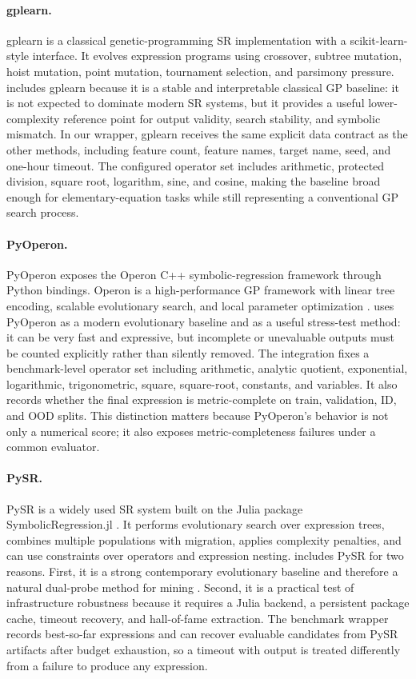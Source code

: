 \paragraph{gplearn.}
gplearn is a classical genetic-programming SR implementation with a scikit-learn-style interface. It evolves expression programs using crossover, subtree mutation, hoist mutation, point mutation, tournament selection, and parsimony pressure. \arena{} includes gplearn because it is a stable and interpretable classical GP baseline: it is not expected to dominate modern SR systems, but it provides a useful lower-complexity reference point for output validity, search stability, and symbolic mismatch. In our wrapper, gplearn receives the same explicit data contract as the other methods, including feature count, feature names, target name, seed, and one-hour timeout. The configured operator set includes arithmetic, protected division, square root, logarithm, sine, and cosine, making the baseline broad enough for elementary-equation tasks while still representing a conventional GP search process.

\paragraph{PyOperon.}
PyOperon exposes the Operon C++ symbolic-regression framework through Python bindings. Operon is a high-performance GP framework with linear tree encoding, scalable evolutionary search, and local parameter optimization \citep{burlacu2020operon}. \arena{} uses PyOperon as a modern evolutionary baseline and as a useful stress-test method: it can be very fast and expressive, but incomplete or unevaluable outputs must be counted explicitly rather than silently removed. The integration fixes a benchmark-level operator set including arithmetic, analytic quotient, exponential, logarithmic, trigonometric, square, square-root, constants, and variables. It also records whether the final expression is metric-complete on train, validation, ID, and OOD splits. This distinction matters because PyOperon's \core{} behavior is not only a numerical score; it also exposes metric-completeness failures under a common evaluator.

\paragraph{PySR.}
PySR is a widely used SR system built on the Julia package SymbolicRegression.jl \citep{cranmer2023pysr}. It performs evolutionary search over expression trees, combines multiple populations with migration, applies complexity penalties, and can use constraints over operators and expression nesting. \arena{} includes PySR for two reasons. First, it is a strong contemporary evolutionary baseline and therefore a natural dual-probe method for mining \candidate{}. Second, it is a practical test of infrastructure robustness because it requires a Julia backend, a persistent package cache, timeout recovery, and hall-of-fame extraction. The benchmark wrapper records best-so-far expressions and can recover evaluable candidates from PySR artifacts after budget exhaustion, so a timeout with output is treated differently from a failure to produce any expression.

